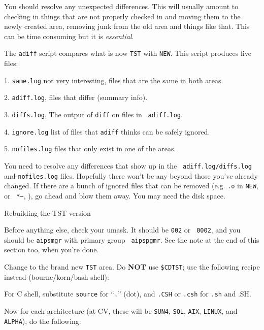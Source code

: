 \medskip\noindent You should resolve any unexpected differences.  This
will usually amount to checking in things that are not properly
checked in and moving them to the newly created area, removing junk
from the old area and things like that.  This can be time consuming
but it is {\it essential\/}.

The {\tt adiff} script compares what is now {\tt TST} with {\tt NEW}.
This script produces five files:
\medskip

\item{1.} {\tt same.log} not very interesting, files that are the same
	in both areas.
\item{2.} {\tt adiff.log}, files that differ (summary info).
\item{3.} {\tt diffs.log}, The output of {\tt diff} on files in {\tt
	adiff.log}.
\item{4.} {\tt ignore.log} list of files that {\tt adiff} thinks can
	be safely ignored.
\item{5.} {\tt nofiles.log} files that only exist in one of the areas.
\medskip

\noindent You need to resolve any differences that show up in the {\tt
adiff.log/diffs.log} and {\tt nofiles.log} files.  Hopefully there won't
be any beyond those you've already changed.  If there are a bunch of
ignored files that can be removed (e.g. {\tt *.o} in {\tt NEW}, or {\tt
*\~{}}, \etc), go ahead and blow them away.  You may need the disk
space.

\newsubsection Rebuilding the TST version

Before anything else, check your umask.  It should be {\tt 002} or {\tt
0002}, and you should be {\tt aipsmgr} with primary group {\tt
aipspgmr}.  See the note at the end of this section too, when you're
done.

Change to the brand new {\tt TST} area.  Do {\bf NOT} use {\tt\$CDTST};
use the following recipe instead (bourne/korn/bash shell):\medskip

\medskip

\noindent For C shell, substitute {\tt source} for ``{\tt .}'' (dot),
and {\tt .CSH} or {\tt .csh} for {\tt .sh} and {.SH}.

Now for each architecture (at CV, these will be {\tt SUN4}, {\tt SOL},
{\tt AIX}, {\tt LINUX}, and {\tt ALPHA}), do the following:\medskip

